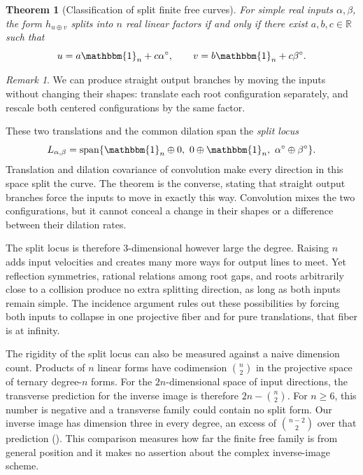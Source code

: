 \documentclass[12pt,reqno]{amsart}
\newtheorem{theorem}{Theorem}[section]
\theoremstyle{definition}
\theoremstyle{remark}
\newtheorem*{remark*}{Remark}
\newcommand{\R}{\mathbb R}
\newcommand{\one}{\mathbbm{1}_n}
\begin{document}
\begin{theorem}[Classification of split finite free curves]
\label{thm:intro-split-locus}
For simple real inputs \(\alpha,\beta\), the form \(h_{u\oplus v}\)
splits into \(n\) real linear factors if and only if there exist
\(a,b,c\in\R\) such that
\begin{equation}\label{eq:intro-split-directions}
 u=a\one+c\alpha^\circ,
 \qquad v=b\one+c\beta^\circ.
\end{equation}
\end{theorem}

\begin{remark*}
We can produce straight output branches by moving the inputs without changing their shapes: translate each root configuration separately, and rescale both centered configurations by the same factor.
\end{remark*}

These two translations and the common dilation span the \emph{split locus}
\begin{equation}\label{eq:intro-split-locus}
 L_{\alpha,\beta}
 =\operatorname{span}\{\one\oplus0,\ 0\oplus\one,\
                       \alpha^\circ\oplus\beta^\circ\}.
\end{equation}
Translation and dilation covariance of convolution make every direction
in this space split the curve. The theorem is the converse, stating that straight output branches force the inputs to move in exactly this way.  Convolution mixes the two configurations, but it cannot conceal a change in their shapes or a difference between their dilation rates.

The split locus is therefore 3-dimensional however large the degree. Raising \(n\) adds input velocities and creates many more ways for output
lines to meet.  Yet reflection symmetries, rational relations among root
gaps, and roots arbitrarily close to a collision produce no extra
splitting direction, as long as both inputs remain simple.  The incidence
argument rules out these possibilities by forcing both inputs to collapse
in one projective fiber and for pure translations, that fiber is at infinity.

The rigidity of the split locus can also be measured against
a naive dimension count. Products of \(n\) linear forms have codimension \(\binom n2\) in the projective space of ternary degree-\(n\) forms.  For the \(2n\)-dimensional space of input directions, the transverse prediction for the inverse image is therefore \(2n-\binom n2\).
For \(n\geq6\), this number is negative and a transverse family could
contain no split form.  Our inverse image has dimension three in every
degree, an excess of \(\binom{n-2}{2}\) over that prediction
(). This comparison measures how far the finite
free family is from general position and it makes no assertion about the
complex inverse-image scheme.
\end{document}
